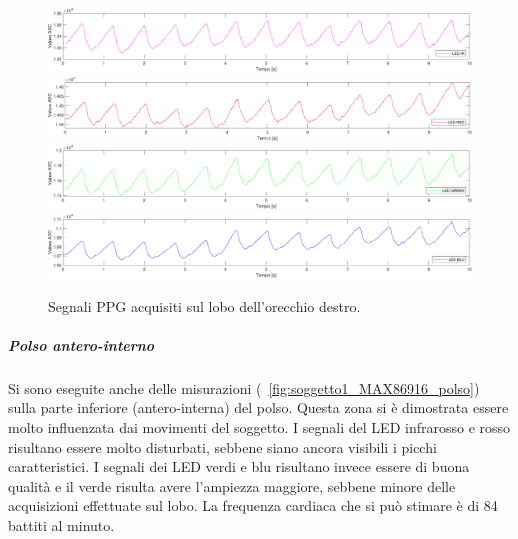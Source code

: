 \begin{figure}[h]
	\centering
	\includegraphics[width=1\linewidth]{ImageFiles/Misure Preliminari/Soggetto 1/MAX86916/lobo_ired}
	\includegraphics[width=1\linewidth]{ImageFiles/Misure Preliminari/Soggetto 1/MAX86916/lobo_red}
	\includegraphics[width=1\linewidth]{ImageFiles/Misure Preliminari/Soggetto 1/MAX86916/lobo_green}
	\includegraphics[width=1\linewidth]{ImageFiles/Misure Preliminari/Soggetto 1/MAX86916/lobo_blu}
	\caption{Segnali PPG acquisiti sul lobo dell'orecchio destro.}
	\label{fig:soggetto1_MAX86916_lobo}
\end{figure}

\clearpage

\subparagraph{Polso antero-interno}

Si sono eseguite anche delle misurazioni (\Fig~\ref{fig:soggetto1_MAX86916_polso}) sulla parte inferiore (antero-interna) del polso. Questa zona si è dimostrata essere molto influenzata dai movimenti del soggetto. I segnali del LED infrarosso e rosso risultano essere molto disturbati, sebbene siano ancora visibili i picchi caratteristici. I segnali dei LED verdi e blu risultano invece essere di buona qualità e il verde risulta avere l'ampiezza maggiore, sebbene minore delle acquisizioni effettuate sul lobo. La frequenza cardiaca che si può stimare è di 84 battiti al minuto.


